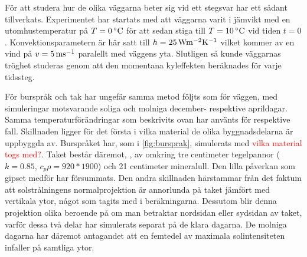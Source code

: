 För att studera hur de olika väggarna beter sig vid ett stegsvar har ett sådant tillverkats. Experimentet
har startats med att väggarna varit i jämvikt med en utomhustemperatur på $T = \unit[0]{^\circ C}$ för att
sedan stiga till $T = \unit[10]{^\circ C}$ vid tiden $t=0$. Konvektionsparametern är här satt till
$h = \unit[25]{W m^{-2}K^{-1}}$ vilket kommer av en vind på
$v = \unit[5]{ms^{-1}}$ paralellt med väggens yta. Slutligen så kunde väggarnas
tröghet studeras genom att den momentana kyleffekten beräknades för varje tidssteg. 

För burspråk och tak har ungefär samma metod följts som för väggen, med simuleringar motsvarande soliga och molniga december- respektive aprildagar. Samma temperaturförändringar som beskrivits ovan har använts för respektive fall. Skillnaden ligger för det första i vilka material de olika byggnadsdelarna är uppbyggda av. Burspråket har, som i \ref{fig:bursprak}, simulerats med \textcolor{red}{vilka material togs med?}. Taket består däremot, , av omkring tre centimeter tegelpannor ($k = 0.85$, $c_p\rho = 920*1900$) och 21 centimeter mineralull. Den lilla påverkan som gipset medför har försummats. Den andra skillnaden härstammar från det faktum att solstrålningens normalprojektion är annorlunda på taket jämfört med vertikala ytor, något som tagits med i beräkningarna. Dessutom blir denna projektion olika beroende på om man betraktar nordsidan eller sydsidan av taket, varför dessa två delar har simulerats separat på de klara dagarna. De molniga dagarna har däremot antagandet att en femtedel av maximala solintensiteten infaller på samtliga ytor.
